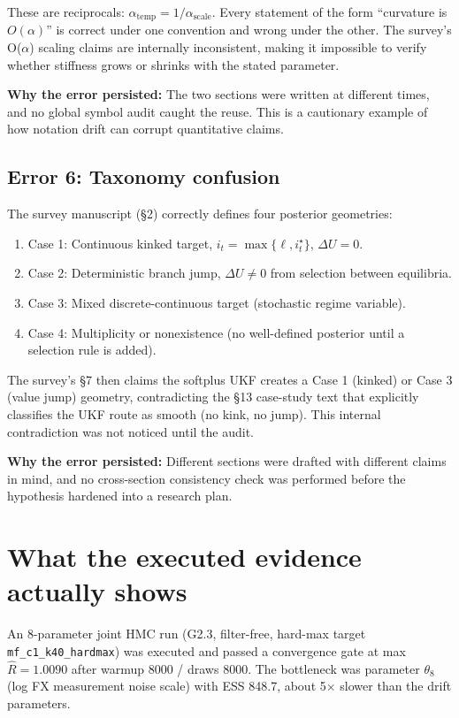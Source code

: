 These are reciprocals: $\alpha_{\text{temp}} = 1/\alpha_{\text{scale}}$. Every statement of the form ``curvature is $O(\alpha)$'' is correct under one convention and wrong under the other. The survey's O($\alpha$) scaling claims are internally inconsistent, making it impossible to verify whether stiffness grows or shrinks with the stated parameter.

\textbf{Why the error persisted:} The two sections were written at different times, and no global symbol audit caught the reuse. This is a cautionary example of how notation drift can corrupt quantitative claims.

\subsection{Error 6: Taxonomy confusion}

The survey manuscript (§2) correctly defines four posterior geometries:
\begin{enumerate}
\item Case 1: Continuous kinked target, $i_t = \max\{\ell, i_t^\star\}$, $\Delta U = 0$.
\item Case 2: Deterministic branch jump, $\Delta U \neq 0$ from selection between equilibria.
\item Case 3: Mixed discrete-continuous target (stochastic regime variable).
\item Case 4: Multiplicity or nonexistence (no well-defined posterior until a selection rule is added).
\end{enumerate}

The survey's §7 then claims the softplus UKF creates a Case 1 (kinked) or Case 3 (value jump) geometry, contradicting the §13 case-study text that explicitly classifies the UKF route as smooth (no kink, no jump). This internal contradiction was not noticed until the audit.

\textbf{Why the error persisted:} Different sections were drafted with different claims in mind, and no cross-section consistency check was performed before the hypothesis hardened into a research plan.

\section{What the executed evidence actually shows}

An 8-parameter joint HMC run (G2.3, filter-free, hard-max target \texttt{mf\_c1\_k40\_hardmax}) was executed and passed a convergence gate at max $\hat{R} = 1.0090$ after warmup 8000 / draws 8000. The bottleneck was parameter $\theta_8$ (log FX measurement noise scale) with ESS 848.7, about 5$\times$ slower than the drift parameters.

